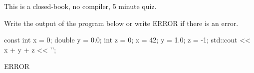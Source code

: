 

This is a closed-book, no compiler, 5 minute quiz.

\nextq
Write the output of the program below or write ERROR if there is
an error.
\begin{console}[fontsize=\small]
const int x = 0;
double y = 0.0;
int z = 0;
x = 42;
y = 1.0;
z = -1;
std::cout << x + y + z << '\n';
\end{console}
\ANSWER
\begin{answercode}
ERROR
\end{answercode}


